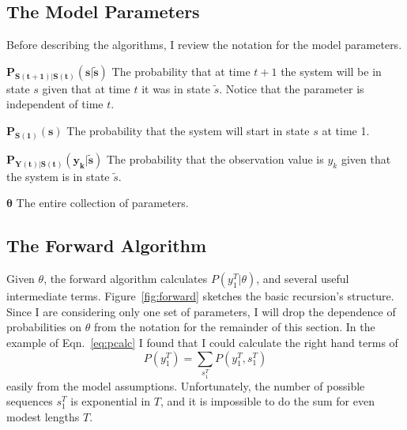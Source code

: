 \documentclass[]{article}
\newcommand{\parameters}{\theta}
\newcommand{\ts}[3]{#1_{#2}^{#3}}                    %
\newcommand{\ti}[2]{{#1}{(#2)}}                  %
\newenvironment{symbdescription}{%
  \list{}{%
    \labelwidth\nomlabelwidth
    \leftmargin\labelwidth
    \advance\leftmargin\labelsep
    \itemsep\nomitemsep
    \let\makelabel\nomlabel}}%
{\endlist}
\begin{document}
\subsection{The Model Parameters}
\label{sec:parameters}

Before describing the algorithms, I review the notation for the model
parameters.  \setlength{\nomlabelwidth}{2.7cm}%
\begin{symbdescription}
\item[$\bm{P_{\ti{S}{t+1}|\ti{S}{t}}(s|{\tilde s})}$] The probability that
  at time $t+1$ the system will be in state $s$ given that at time
  $t$ it was in state ${\tilde s}$.  Notice that the parameter is independent
  of time $t$.
\item[$\bm{P_{\ti{S}{1}}(s)}$] The probability that the system will
  start in state $s$ at time 1.
\item[$\bm{P_{\ti{Y}{t}|\ti{S}{t}}(y_k|{\tilde s})}$] The probability that
  the observation value is $y_k$ given that the system is in state ${\tilde s}$.
\item[$\bm{\parameters}$] The entire collection of parameters.
\end{symbdescription}

\subsection{The Forward Algorithm}
\label{sec:forward}

Given $\parameters$, the forward algorithm calculates
$P(\ts{y}{1}{T}|\parameters)$, and several useful intermediate terms.
Figure~\ref{fig:forward} sketches the basic recursion's structure.
Since I are considering only one set of parameters, I will drop the
dependence of probabilities on $\parameters$ from the notation for the
remainder of this section.  In the example of Eqn.~\eqref{eq:pcalc} I
found that I could calculate the right hand terms of
\begin{equation*}
   P\left( \ts{y}{1}{T} \right) = \sum_{\ts{s}{1}{T}}
   P\left( \ts{y}{1}{T},\ts{s}{1}{T} \right)
\end{equation*}
easily from the model assumptions.  Unfortunately, the number of
possible sequences $\ts{s}{1}{T}$ is exponential in $T$, and it is
impossible to do the sum for even modest lengths $T$.
\end{document}
